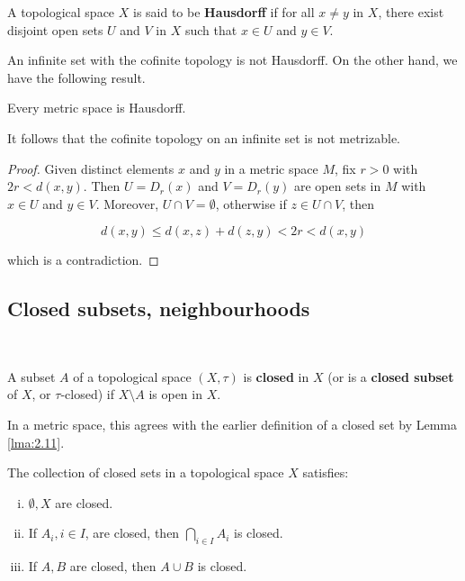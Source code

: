 \documentclass[a4paper,11pt]{article}
\begin{document}
\begin{definition}
    A topological space $X$ is said to be \textbf{Hausdorff} if for all $x \neq y$ in $X$, there exist disjoint open sets $U$ and $V$ in $X$ such that $x \in U$ and $y \in V$.
\end{definition}

\begin{note}
    An infinite set with the cofinite topology is not Hausdorff. On the other hand, we have the following result.
\end{note}

\begin{proposition}
    Every metric space is Hausdorff.
\end{proposition}

It follows that the cofinite topology on an infinite set is not metrizable.
\begin{proof}
    Given distinct elements $x$ and $y$ in a metric space $M$, fix $r>0$ with $2 r<d(x, y)$. Then $U=D_{r}(x)$ and $V=D_{r}(y)$ are open sets in $M$ with $x \in U$ and $y \in V$. Moreover, $U \cap V=\emptyset$, otherwise if $z \in U \cap V$, then

$$
d(x, y) \leqslant d(x, z)+d(z, y)<2 r<d(x, y)
$$

which is a contradiction.
\end{proof}

\subsection{Closed subsets, neighbourhoods}
\ \vspace{-1.5em}
\begin{definition}
    A subset $A$ of a topological space $(X, \tau)$ is \textbf{closed} in $X$ (or is a \textbf{closed subset} of $X$, or $\tau$-closed) if $X \setminus A$ is open in $X$.
\end{definition}

In a metric space, this agrees with the earlier definition of a closed set by Lemma \ref{lma:2.11}.

\begin{proposition}
    The collection of closed sets in a topological space $X$ satisfies:

\begin{enumerate}[(i)]
    \item $\emptyset, X$ are closed.

    \item If $A_{i}, i \in I$, are closed, then $\bigcap_{i \in I} A_{i}$ is closed.
    
    \item If $A, B$ are closed, then $A \cup B$ is closed.
\end{enumerate}
\end{proposition}
\end{document}
